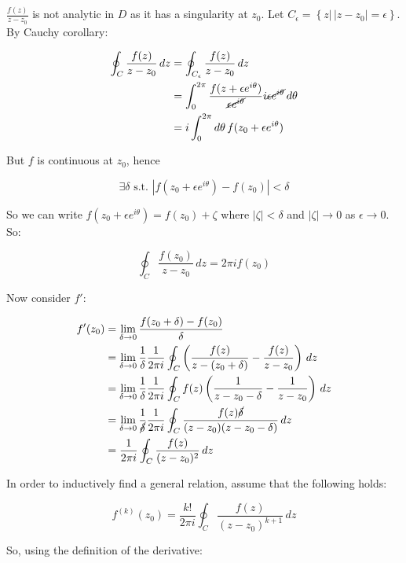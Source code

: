 \documentclass{../../physics_notes}
\begin{document}
$\frac{f(z)}{z - z_0}$ is not analytic in $D$ as it has a singularity at $z_0$. Let $C_\epsilon = \left\{ z \rvert \, |z - z_0 | = \epsilon \right\}$. By Cauchy corollary:

\begin{align*}
\oint_{C} \frac{f(z)}{z - z_0} \, dz &= \oint_{C_\epsilon} \frac{f(z)}{z - z_0} \, dz \\
&= \int^{2\pi}_0 \frac{f(z + \epsilon e^{i\theta})}{\cancel{\epsilon e^{i\theta}}} i \cancel{\epsilon e^{i\theta}} \, d\theta \\
&= i\int_0^{2\pi} d\theta \, f(z_0 + \epsilon e^{i\theta})
\end{align*}

But $f$ is continuous at $z_0$, hence

\[ \exists \delta \text{ s.t. } |f(z_0 + \epsilon e^{i\theta}) - f(z_0)| < \delta\]

So we can write $f(z_0 + \epsilon e^{i\theta}) = f(z_0) + \zeta$ where $|\zeta| < \delta$ and $|\zeta| \to 0$ as $\epsilon \to 0$. So:

\[ \oint_C \frac{f(z_0)}{z - z_0}\, dz = 2\pi i f(z_0) \]

Now consider $f'$:

\begin{align*}
f'(z_0) &= \lim_{\delta\to 0} \frac{f(z_0 + \delta) - f(z_0)}{\delta} \\
&= \lim_{\delta\to 0} \frac{1}{\delta} \frac{1}{2\pi i} \oint_C\left(\frac{f(z)}{z - (z_0 + \delta)} - \frac{f(z)}{z - z_0}\right)\, dz \\
&= \lim_{\delta\to 0} \frac{1}{\delta} \frac{1}{2\pi i} \oint_C f(z) \left(\frac{1}{z - z_0 - \delta} - \frac{1}{z - z_0}\right)\, dz \\
&= \lim_{\delta\to 0} \frac{1}{\cancel{\delta}} \frac{1}{2\pi i} \oint_C \frac{f(z)\cancel{\delta}}{(z-z_0)(z-z_0-\delta)}\, dz \\
&= \frac{1}{2\pi i}\oint_C \frac{f(z)}{(z-z_0)^2} \, dz
\end{align*}

In order to inductively find a general relation, assume that the following holds:

\begin{equation}\label{eq:integral_formula}
f^{(k)}(z_0) =  \frac{k!}{2\pi i } \oint_C \frac{f(z)}{(z - z_0)^{k+1}} \, dz 
\end{equation}

So, using the definition of the derivative:
\end{document}

